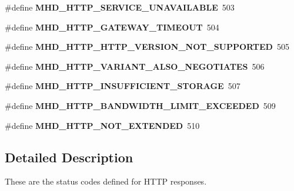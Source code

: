 \begin{DoxyCompactItemize}
\item 
\hypertarget{group__httpcode_gafef063777cd19422cfebb36e1fd2e6fe}{\#define {\bfseries \-M\-H\-D\-\_\-\-H\-T\-T\-P\-\_\-\-S\-E\-R\-V\-I\-C\-E\-\_\-\-U\-N\-A\-V\-A\-I\-L\-A\-B\-L\-E}~503}\label{group__httpcode_gafef063777cd19422cfebb36e1fd2e6fe}

\item 
\hypertarget{group__httpcode_ga7ee6c003bb30589f072a4b1574776371}{\#define {\bfseries \-M\-H\-D\-\_\-\-H\-T\-T\-P\-\_\-\-G\-A\-T\-E\-W\-A\-Y\-\_\-\-T\-I\-M\-E\-O\-U\-T}~504}\label{group__httpcode_ga7ee6c003bb30589f072a4b1574776371}

\item 
\hypertarget{group__httpcode_ga945f4f31b2c37a89a4dd437cf13453ab}{\#define {\bfseries \-M\-H\-D\-\_\-\-H\-T\-T\-P\-\_\-\-H\-T\-T\-P\-\_\-\-V\-E\-R\-S\-I\-O\-N\-\_\-\-N\-O\-T\-\_\-\-S\-U\-P\-P\-O\-R\-T\-E\-D}~505}\label{group__httpcode_ga945f4f31b2c37a89a4dd437cf13453ab}

\item 
\hypertarget{group__httpcode_ga26d6adb871c0b2c3e4c22c770ea255f5}{\#define {\bfseries \-M\-H\-D\-\_\-\-H\-T\-T\-P\-\_\-\-V\-A\-R\-I\-A\-N\-T\-\_\-\-A\-L\-S\-O\-\_\-\-N\-E\-G\-O\-T\-I\-A\-T\-E\-S}~506}\label{group__httpcode_ga26d6adb871c0b2c3e4c22c770ea255f5}

\item 
\hypertarget{group__httpcode_ga60b3b1f6190f54a141a7cc92bf71b1fe}{\#define {\bfseries \-M\-H\-D\-\_\-\-H\-T\-T\-P\-\_\-\-I\-N\-S\-U\-F\-F\-I\-C\-I\-E\-N\-T\-\_\-\-S\-T\-O\-R\-A\-G\-E}~507}\label{group__httpcode_ga60b3b1f6190f54a141a7cc92bf71b1fe}

\item 
\hypertarget{group__httpcode_ga0a5f766887a0b65d05b4493066f06ea9}{\#define {\bfseries \-M\-H\-D\-\_\-\-H\-T\-T\-P\-\_\-\-B\-A\-N\-D\-W\-I\-D\-T\-H\-\_\-\-L\-I\-M\-I\-T\-\_\-\-E\-X\-C\-E\-E\-D\-E\-D}~509}\label{group__httpcode_ga0a5f766887a0b65d05b4493066f06ea9}

\item 
\hypertarget{group__httpcode_gaa9507b08f1aa794f7a4e69eae1b216f1}{\#define {\bfseries \-M\-H\-D\-\_\-\-H\-T\-T\-P\-\_\-\-N\-O\-T\-\_\-\-E\-X\-T\-E\-N\-D\-E\-D}~510}\label{group__httpcode_gaa9507b08f1aa794f7a4e69eae1b216f1}

\end{DoxyCompactItemize}


\subsection{\-Detailed \-Description}
\-These are the status codes defined for \-H\-T\-T\-P responses. 